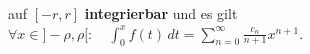 \documentclass[landscape, 10pt]{article}
\newcommand{\R}{\mathbb{R}}
\begin{document}
\begin{multicols}{3}
                     auf \textcolor{NavyBlue}{$[-r,r]$}
                     \textbf{integrierbar} und es gilt 
                     \textcolor{NavyBlue}{$\forall x\in]-\rho,\rho[:\quad
                     \int_0^xf(t)\,dt
                     =\sum_{n=0}^\infty\frac{c_n}{n+1}x^{n+1}$}.

\end{multicols}
\end{document}
